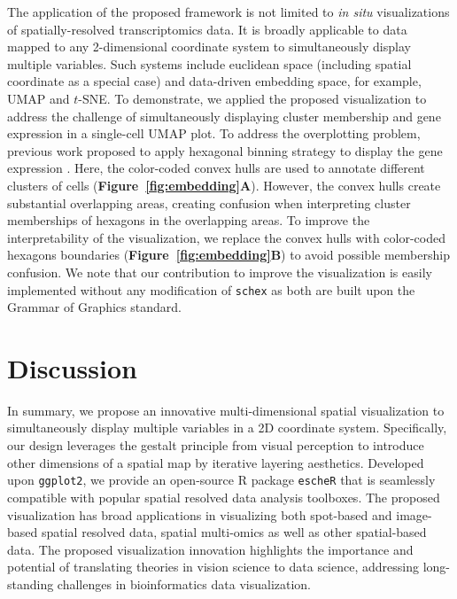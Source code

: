 \documentclass[10pt,twocolumn]{article}
\begin{document}
The application of the proposed framework is not limited to \textit{in situ} visualizations of spatially-resolved transcriptomics data. It is broadly applicable to data mapped to any 2-dimensional coordinate system to simultaneously display multiple variables. Such systems include euclidean space (including spatial coordinate as a special case) and data-driven embedding space, for example, UMAP and $t$-SNE. To demonstrate, we applied the proposed visualization to address the challenge of simultaneously displaying cluster membership and gene expression in a single-cell UMAP plot. To address the overplotting problem, previous work proposed to apply hexagonal binning strategy to display the gene expression \cite{freytag_2020}. Here, the color-coded convex hulls are used to annotate different clusters of cells (\textbf{Figure~\ref{fig:embedding}A}). However, the convex hulls create substantial overlapping areas, creating confusion when interpreting cluster memberships of hexagons in the overlapping areas. To improve the interpretability of the visualization, we replace the convex hulls with color-coded hexagons boundaries  (\textbf{Figure~\ref{fig:embedding}B}) to avoid possible membership confusion. We note that our contribution to improve the visualization is easily implemented without any modification of \texttt{schex} as both are built upon the Grammar of Graphics \cite{wilkinson_2012} standard.


\section{Discussion}
In summary, we propose an innovative multi-dimensional spatial visualization to simultaneously display multiple variables in a 2D coordinate system. Specifically, our design leverages the gestalt principle from visual perception to introduce other dimensions of a spatial map by iterative layering aesthetics. Developed upon \texttt{ggplot2}, we provide an open-source R package \texttt{escheR} that is seamlessly compatible with popular spatial resolved data analysis toolboxes. The proposed visualization has broad applications in visualizing both spot-based and image-based spatial resolved data, spatial multi-omics as well as other spatial-based data. The proposed visualization innovation highlights the importance and potential of translating theories in vision science to data science, addressing long-standing challenges in bioinformatics data visualization.


\end{document}
